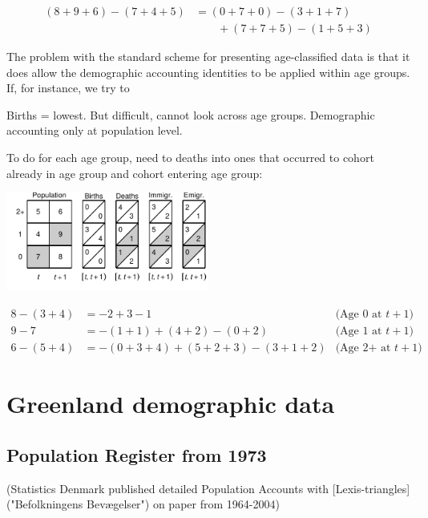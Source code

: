 \documentclass[USenglish]{article}
\begin{document}
\begin{equation*}
  \begin{split}
    (8+9+6) - (7+4+5) & = (0+7+0) - (3+1+7) \\
    & \quad \quad + (7+7+5) - (1+5+3)
  \end{split}
\end{equation*}
    
The problem with the standard scheme for presenting age-classified data is that it does allow the demographic accounting identities to be applied within age groups. If, for instance, we try to  

Births = lowest. But difficult, cannot look across age groups. Demographic accounting only at population level.

To do for each age group, need to deaths into ones that occurred to cohort already in age group and cohort entering age group:
\begin{center}
\includegraphics[width=0.5\textwidth]{figures_accounts/fig_account_withage_lex.pdf}
\end{center}

\begin{align}
    8 - (3 + 4) & = -2 + 3 - 1 & \text{(Age 0 at $t+1$)} \\   
    9 - 7 & = -(1 + 1) + (4 + 2) - (0 + 2) & \text{(Age 1 at $t+1$)} \\
    6 - (5 + 4) & = -(0 + 3 + 4) + (5 + 2 + 3) - (3 + 1 + 2)  & \text{(Age 2+ at $t+1$)}
\end{align}




\section{Greenland demographic data}

\subsection{Population Register from 1973} 

(Statistics Denmark published detailed Population Accounts with [Lexis-triangles]("Befolkningens Bevægelser") on paper from 1964-2004)
\end{document}
